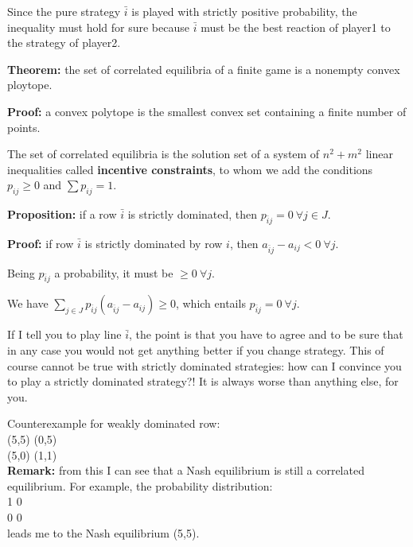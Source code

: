 \noindent Since the pure strategy $\bar{i}$ is played with strictly positive probability, the inequality must hold for sure because $\bar{i}$ must be the best reaction of player1 to the strategy of player2.

\bigskip
\noindent \textbf{Theorem:} the set of correlated equilibria of a finite game is a nonempty convex ploytope.

\bigskip
\noindent \textbf{Proof:} a convex polytope is the smallest convex set containing a finite number of points.

\noindent The set of correlated equilibria is the solution set of a system of $n^2+m^2$ linear inequalities called \textbf{incentive constraints}, to whom we add the conditions $p_{ij} \geq 0$ and $\sum p_{ij} = 1$. 

\bigskip
\noindent \textbf{Proposition:} if a row $\bar{i}$ is strictly dominated, then $p_{\bar{i}j} = 0 ~\forall j \in J$.

\bigskip
\noindent \textbf{Proof:} if row $\bar{i}$ is strictly dominated by row $i$, then $a_{\bar{i}j} - a_{ij} < 0 ~\forall j$.

\noindent Being $p_{\bar{i}j}$ a probability, it must be $\geq 0 ~\forall j$.

\noindent We have $\sum_{j \in J}p_{\bar{i}j}(a_{\bar{i}j} - a_{ij}) \geq 0$, which entails $p_{\bar{i}j} = 0 ~\forall j$.

\bigskip
\noindent If I tell you to play line $\bar{i}$, the point is that you have to 
agree and to be sure that in any case you would not get anything better if 
you change strategy. This of course cannot be true with strictly dominated 
strategies: how can I convince you to play a strictly dominated strategy?! It 
is always worse than anything else, for you.

\noindent Counterexample for weakly dominated row:\\
(5,5)	(0,5)\\
(5,0)	(1,1)\\
\textbf{Remark:} from this I can see that a Nash equilibrium is still a correlated 
equilibrium. For example, the probability distribution:\\
1	0\\
0	0\\
leads me to the Nash equilibrium (5,5).

%

